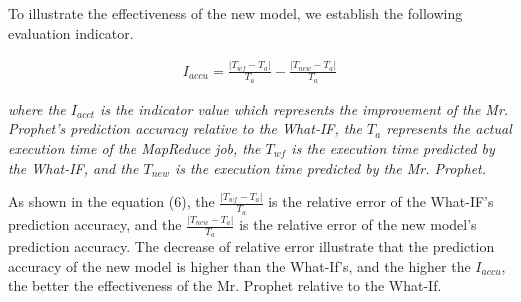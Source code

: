 To illustrate the effectiveness of the new model, we establish the following evaluation indicator.
\begin{small}
\begin{equation}
\begin{split}
I_{accu}=\frac{|T_{wf}-T_a|}{T_a} - \frac{|T_{new}-T_a|}{T_a}
\end{split}
\end{equation}
\end{small}

\emph{where the $I_{acct}$ is the indicator value which represents the improvement of the Mr. Prophet's prediction accuracy relative to the What-IF, the $T_a$ represents the actual execution time of the MapReduce job, the $T_{wf}$ is the execution time predicted by the What-IF, and the $T_{new}$ is the execution time predicted by the Mr. Prophet.}

As shown in the equation (6), the $\frac{|T_{wf}-T_a|}{T_a}$ is the relative error of the What-IF's prediction accuracy, and the $\frac{|T_{new}-T_a|}{T_a}$ is the relative error of the new model's prediction accuracy. The decrease of relative error illustrate that the prediction accuracy of the new model is higher than the What-If's, and the higher the $I_{accu}$, the better the effectiveness of the Mr. Prophet relative to the What-If.

